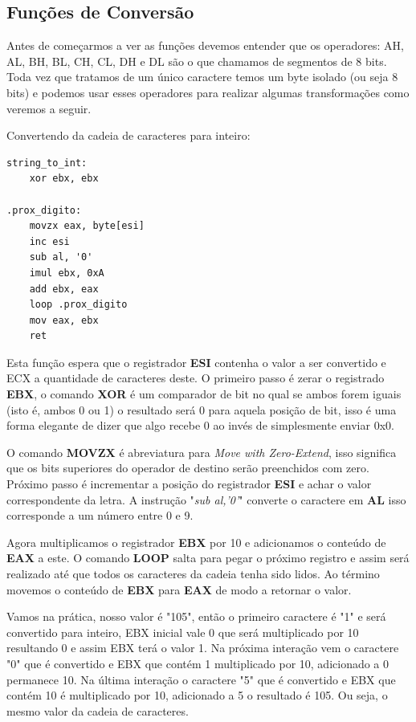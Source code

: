 \subsection{Funções de Conversão}

Antes de começarmos a ver as funções devemos entender que os operadores: AH, AL, BH, BL, CH, CL, DH e DL são o que chamamos de segmentos de 8 bits. Toda vez que tratamos de um único caractere temos um byte isolado (ou seja 8 bits) e podemos usar esses operadores para realizar algumas transformações como veremos a seguir.

Convertendo da cadeia de caracteres para inteiro:
\begin{lstlisting}[]
string_to_int:
	xor ebx, ebx

.prox_digito:
	movzx eax, byte[esi]
	inc esi
	sub al, '0'
	imul ebx, 0xA
	add ebx, eax
	loop .prox_digito
	mov eax, ebx
	ret
\end{lstlisting}

Esta função espera que o registrador \textbf{ESI} contenha o valor a ser convertido e ECX a quantidade de caracteres deste. O primeiro passo é zerar o registrado \textbf{EBX}, o comando \textbf{XOR} é um comparador de bit no qual se ambos forem iguais (isto é, ambos 0 ou 1) o resultado será 0 para aquela posição de bit, isso é uma forma elegante de dizer que algo recebe 0 ao invés de simplesmente enviar 0x0.

O comando \textbf{MOVZX} é abreviatura para \textit{Move with Zero-Extend}, isso significa que os bits superiores do operador de destino serão preenchidos com zero. Próximo passo é incrementar a posição do registrador \textbf{ESI} e achar o valor correspondente da letra. A instrução "\textit{sub al,'0'}" converte o caractere em \textbf{AL} isso corresponde a um número entre 0 e 9.

Agora multiplicamos o registrador \textbf{EBX} por 10 e adicionamos o conteúdo de \textbf{EAX} a este. O comando \textbf{LOOP} salta para pegar o próximo registro e assim será realizado até que todos os caracteres da cadeia tenha sido lidos. Ao término movemos o conteúdo de \textbf{EBX} para \textbf{EAX} de modo a retornar o valor.

Vamos na prática, nosso valor é "105", então o primeiro caractere é "1" e será convertido para inteiro, EBX inicial vale 0 que será multiplicado por 10 resultando 0 e assim EBX terá o valor 1. Na próxima interação vem o caractere "0" que é convertido e EBX que contém 1 multiplicado por 10, adicionado a 0 permanece 10. Na última interação o caractere "5" que é convertido e EBX que contém 10 é multiplicado por 10, adicionado a 5 o resultado é 105. Ou seja, o mesmo valor da cadeia de caracteres.

